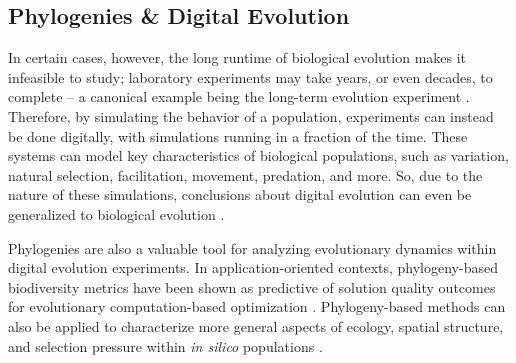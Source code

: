 

\subsection{Phylogenies \& Digital Evolution} \label{sec:introduction:digital}

In certain cases, however, the long runtime of biological evolution makes it infeasible to study; laboratory experiments may take years, or even decades, to complete -- a canonical example being the long-term evolution experiment \citep{wiser2013long}.
Therefore, by simulating the behavior of a population, experiments can instead be done digitally, with simulations running in a fraction of the time.
These systems can model key characteristics of biological populations, such as variation, natural selection, facilitation, movement, predation, and more.
So, due to the nature of these simulations, conclusions about digital evolution can even be generalized to biological evolution \citep{pennock2007models, dolson2021digital}.

Phylogenies are also a valuable tool for analyzing evolutionary dynamics within digital evolution experiments.
In application-oriented contexts, phylogeny-based biodiversity metrics have been shown as predictive of solution quality outcomes for evolutionary computation-based optimization \citep{hernandez2022phylogenetic}.
Phylogeny-based methods can also be applied to characterize more general aspects of ecology, spatial structure, and selection pressure within \textit{in silico} populations \citep{moreno2023toward}.

